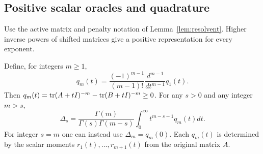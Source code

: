 \subsection{Positive scalar oracles and quadrature}
Use the active matrix and penalty notation of
Lemma~\ref{lem:resolvent}. Higher inverse powers of shifted
matrices give a positive representation for every exponent.
\begin{proposition}\label{prop:allpowers}
Define, for integers $m\geq1$,
\[
 q_m(t)=\frac{(-1)^{m-1}}{(m-1)!}\frac{d^{m-1}}{dt^{m-1}}q_1(t).
\]
Then $q_m(t)=\operatorname{tr}(A+tI)^{-m}-\operatorname{tr}(B+tI)^{-m}\geq0$.
For any $s>0$ and any integer $m>s$,
\begin{equation}\label{eq:allpowers}
 \Delta_s=\frac{\Gamma(m)}{\Gamma(s)\Gamma(m-s)}
       \int_0^\infty t^{m-s-1}q_m(t)dt.
\end{equation}
For integer $s=m$ one can instead use $\Delta_m=q_m(0)$.
Each $q_m(t)$ is determined by the scalar moments
$r_1(t),\ldots,r_{m+1}(t)$ from the original matrix $A$.
\end{proposition}
